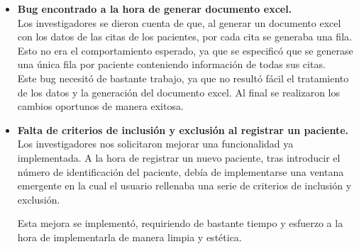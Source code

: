\begin{itemize}
      \item\textbf{Bug encontrado a la hora de generar documento excel.} \\
      Los investigadores se dieron cuenta de que, al generar un documento excel con los datos de las citas de los pacientes, por cada cita se generaba una fila. Esto no era el comportamiento esperado, ya que se especificó que se generase una única fila por paciente conteniendo información de todas sus citas.\\
      
      Este bug necesitó de bastante trabajo, ya que no resultó fácil  el tratamiento de los datos y la generación del documento excel. Al final se realizaron los cambios oportunos de manera exitosa.
      
       \item\textbf{Falta de criterios de inclusión y exclusión al registrar un paciente.} \\
       Los investigadores nos solicitaron mejorar una funcionalidad ya implementada. A la hora de registrar un nuevo paciente, tras introducir el número de identificación del paciente, debía de implementarse una ventana emergente en la cual el usuario rellenaba una serie de criterios de inclusión y exclusión.
       
       Esta mejora se implementó, requiriendo de bastante tiempo y esfuerzo a la hora de implementarla de manera limpia y estética.
      


\end{itemize}


